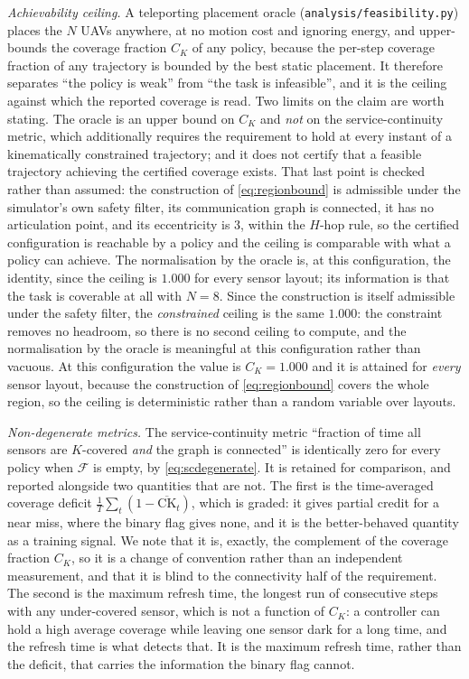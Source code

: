 \documentclass[conference]{IEEEtran}
\begin{document}
\emph{Achievability ceiling.} A teleporting placement oracle
(\texttt{analysis/feasibility.py}) places the $N$ UAVs anywhere, at no
motion cost and ignoring energy, and upper-bounds the coverage fraction
$C_K$ of any policy, because the per-step coverage fraction of any
trajectory is bounded by the best static placement.  It therefore separates
``the policy is weak'' from ``the task is infeasible'', and it is the
ceiling against which the reported coverage is read.  Two limits on the
claim are worth stating.  The oracle is an upper bound on $C_K$ and \emph{not}
on the service-continuity metric, which additionally requires the
requirement to hold at every instant of a kinematically constrained
trajectory; and it does not certify that a feasible trajectory achieving the
certified coverage exists.  That last point is checked rather than
assumed: the construction of \eqref{eq:regionbound} is admissible under
the simulator's own safety filter, its communication graph is connected,
it has no articulation point, and its eccentricity is $3$, within the
$H$-hop rule, so the certified configuration is reachable by a policy
and the ceiling is comparable with what a policy can achieve.  The
normalisation by the oracle is, at this configuration, the identity, since
the ceiling is $1.000$ for every sensor layout; its information is that the
task is coverable at all with $N=8$. Since the construction is itself
admissible under the safety filter, the \emph{constrained} ceiling is
the same $1.000$: the constraint removes no headroom, so there is no
second ceiling to compute, and the normalisation by the oracle is
meaningful at this configuration rather than vacuous.  At this configuration the value is
$C_K=1.000$ and it is attained for \emph{every} sensor layout, because the
construction of \eqref{eq:regionbound} covers the whole region, so the
ceiling is deterministic rather than a random variable over layouts.

\emph{Non-degenerate metrics.} The service-continuity metric
``fraction of time all sensors are $K$-covered \emph{and} the graph is
connected'' is identically zero for every policy when $\mathcal{F}$ is
empty, by \eqref{eq:scdegenerate}.  It is retained for comparison, and
reported alongside two quantities that are not.  The first is the
time-averaged coverage deficit $\frac1T\sum_t(1-\overline{\mathrm{CK}}_t)$,
which is graded: it gives partial credit for a near miss, where the binary
flag gives none, and it is the better-behaved quantity as a training
signal.  We note that it is, exactly, the complement of the coverage
fraction $C_K$, so it is a change of convention rather than an independent
measurement, and that it is blind to the connectivity half of the
requirement.  The second is the maximum refresh time, the longest run of
consecutive steps with any under-covered sensor, which is not a function of
$C_K$: a controller can hold a high average coverage while leaving one
sensor dark for a long time, and the refresh time is what detects that.  It
is the maximum refresh time, rather than the deficit, that carries the
information the binary flag cannot.
\end{document}
